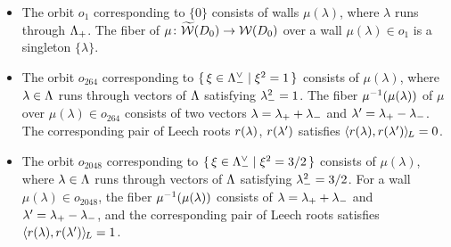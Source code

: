 \documentclass{amsart} %
\begin{document}
\begin{itemize}
\item[($o_{1}$)]
The orbit $o_1$ corresponding to $\{0\}$
consists of walls $\mu(\lambda)$,
where $\lambda$ runs through $\Lambda_{+}$.
The fiber of $\mu\colon \widetilde{\mathord{\mathcal{W}}}(D_0)\to\mathord{\mathcal{W}}(D_0)$ 
over a wall $\mu(\lambda)\in o_1$ is a singleton $\{\lambda\}$.
%
\item[($o_{264}$)]
The orbit $o_{264}$ corresponding to $\{\,{\xi\in \Lambda_{-}^{\vee}}\mid {\xi^2=1} \,\}$
consists of $\mu(\lambda)$,
where $\lambda\in \Lambda$ runs through
vectors of $\Lambda$ satisfying ${\lambda}_{-}^2=1$.
The fiber $\mu^{-1}(\mu(\lambda))$  of $\mu$ 
over $\mu(\lambda)\in o_{264}$ consists 
of two vectors
$\lambda={\lambda}_{+}+{\lambda}_{-}$ and $\lambda^{\prime}={\lambda}_{+}-{\lambda}_{-}$.
The corresponding pair of Leech roots 
$r(\lambda)$, $r(\lambda^{\prime})$ 
satisfies
$\langle r(\lambda), r(\lambda^{\prime}) \rangle_{\hskip -1pt L}=0$.
%
\item[($o_{2048}$)]
The orbit $o_{2048}$ corresponding to $\{\,{\xi\in \Lambda_{-}^{\vee}}\mid {\xi^2=3/2} \,\}$
consists of $\mu(\lambda)$,
where $\lambda\in \Lambda$ runs through
vectors of $\Lambda$ satisfying ${\lambda}_{-}^2=3/2$.
For a wall $\mu(\lambda)\in o_{2048}$, the fiber
 $\mu^{-1}(\mu(\lambda))$ consists of
$\lambda={\lambda}_{+}+{\lambda}_{-}$ and $\lambda^{\prime}={\lambda}_{+}-{\lambda}_{-}$, and 
the corresponding pair of Leech roots 
 satisfies
$\langle r(\lambda), r(\lambda^{\prime}) \rangle_{\hskip -1pt L}=1$.

\end{itemize}
%
\end{document}
